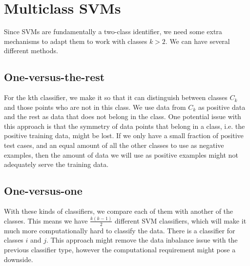 \documentclass{tufte-handout}
\begin{document}
	\section{Multiclass SVMs}
	Since SVMs are fundamentally a two-class identifier, we need some extra mechanisms to adapt them 
	to work with classes $k > 2$. We can have several different methods.
		\subsection{One-versus-the-rest}
		For the kth classifier, we make it so that it can distinguish between classes $C_{k}$ and those 
		points who are not in this class. We use data from $C_{k}$ as positive data and the rest as
		data that does not belong in the class. One potential issue with this approach is that 
		the symmetry of data points that belong in a class, i.e. the positive training data, might be lost.
		If we only have a small fraction of positive test cases, and an equal amount of all the other classes
		to use as negative examples, then the amount of data we will use as positive examples might not 
		adequately serve the training data.
		
		\subsection{One-versus-one}
		With these kinds of classifiers, we compare each of them with another of the classes. This means
		we have $\frac{k(k-1)}{2}$ different SVM classifiers, which will make it much more computationally
		hard to classify the data. There is a classifier for classes $i$ and $j$. This approach might remove
		the data inbalance issue with the previous classifier type, however the computational requirement
		might pose a downside.
\end{document}
